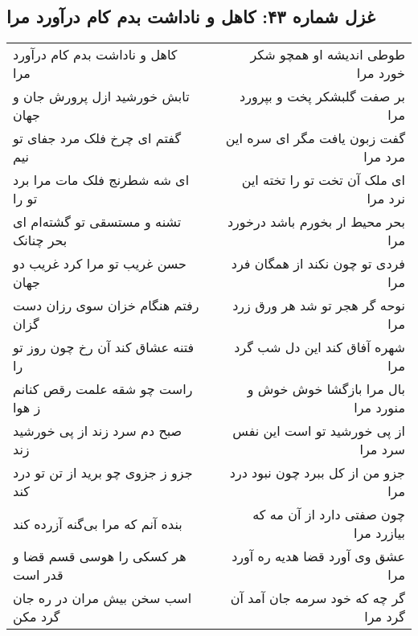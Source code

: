 \begin{center}
\section*{غزل شماره ۴۳: کاهل و ناداشت بدم کام درآورد مرا}
\label{sec:0043}
\begin{longtable}{l p{0.5cm} r}
کاهل و ناداشت بدم کام درآورد مرا
&&
طوطی اندیشه او همچو شکر خورد مرا
\\
تابش خورشید ازل پرورش جان و جهان
&&
بر صفت گلبشکر پخت و بپرورد مرا
\\
گفتم ای چرخ فلک مرد جفای تو نیم
&&
گفت زبون یافت مگر ای سره این مرد مرا
\\
ای شه شطرنج فلک مات مرا برد تو را
&&
ای ملک آن تخت تو را تخته این نرد مرا
\\
تشنه و مستسقی تو گشته‌ام ای بحر چنانک
&&
بحر محیط ار بخورم باشد درخورد مرا
\\
حسن غریب تو مرا کرد غریب دو جهان
&&
فردی تو چون نکند از همگان فرد مرا
\\
رفتم هنگام خزان سوی رزان دست گزان
&&
نوحه گر هجر تو شد هر ورق زرد مرا
\\
فتنه عشاق کند آن رخ چون روز تو را
&&
شهره آفاق کند این دل شب گرد مرا
\\
راست چو شقه علمت رقص کنانم ز هوا
&&
بال مرا بازگشا خوش خوش و منورد مرا
\\
صبح دم سرد زند از پی خورشید زند
&&
از پی خورشید تو است این نفس سرد مرا
\\
جزو ز جزوی چو برید از تن تو درد کند
&&
جزو من از کل ببرد چون نبود درد مرا
\\
بنده آنم که مرا بی‌گنه آزرده کند
&&
چون صفتی دارد از آن مه که بیازرد مرا
\\
هر کسکی را هوسی قسم قضا و قدر است
&&
عشق وی آورد قضا هدیه ره آورد مرا
\\
اسب سخن بیش مران در ره جان گرد مکن
&&
گر چه که خود سرمه جان آمد آن گرد مرا
\\
\end{longtable}
\end{center}
